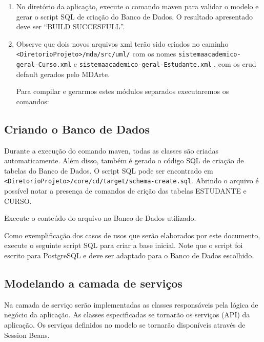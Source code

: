 \begin{enumerate}
\item No diretório da aplicação, execute o comando maven para validar o modelo e
gerar o script SQL de criação do Banco de Dados. O resultado apresentado deve
ser “BUILD SUCCESFULL”.
	
\item Observe que dois novos arquivos xml terão sido criados no caminho
\texttt{<DiretorioProjeto>/mda/src/uml/} com os nomes
\texttt{sistemaacademico-geral-Curso.xml} e
\texttt{sistemaacademico-geral-Estudante.xml} , com os crud default gerados pelo
MDArte.

Para compilar e gerarmos estes módulos separados executaremos os comandos:
	
\begin{framed}
	
\end{framed}

\end{enumerate}

\subsection{Criando o Banco de Dados}

Durante a execução do comando maven, todas as classes são criadas
automaticamente. Além disso, também é gerado o código SQL de criação de tabelas
do Banco de Dados. O script SQL pode ser encontrado em
\texttt{<DiretorioProjeto>/core/cd/target/schema-create.sql}. Abrindo o arquivo
é possível notar a presença de comandos de crição das tabelas ESTUDANTE e CURSO.

Execute o conteúdo do arquivo no Banco de Dados utilizado.

Como exemplificação dos casos de usos que serão elaborados por este documento,
execute o seguinte script SQL para criar a base inicial. Note que o script foi
escrito para PostgreSQL e deve ser adaptado para o Banco de Dados escolhido.

\begin{framed}
	
\end{framed}

\subsection{Modelando a camada de serviços}

Na camada de serviço serão implementadas as classes responsáveis pela lógica de
negócio da aplicação. As classes especificadas se tornarão os serviços (API) da
aplicação. Os serviços definidos no modelo se tornarão disponíveis através de
Session Beans.

